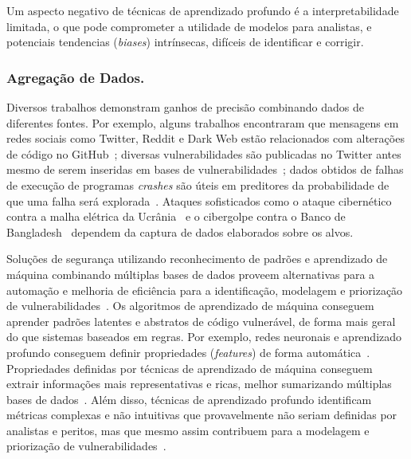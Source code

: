 Um aspecto negativo de técnicas de aprendizado profundo é a interpretabilidade limitada, o que pode comprometer a utilidade de modelos para analistas, e potenciais tendencias (\emph{biases}) intrínsecas, difíceis de identificar e corrigir.

\subsubsection{Agregação de Dados.}

Diversos trabalhos demonstram ganhos de precisão combinando dados de diferentes fontes. Por exemplo, alguns trabalhos encontraram que mensagens em redes sociais como Twitter, Reddit e Dark Web estão relacionados com alterações de código no GitHub~\cite{sameera19social}; diversas vulnerabilidades são publicadas no Twitter antes mesmo de serem inseridas em bases de vulnerabilidades~\cite{chen19vase,sabottke2015vulnerability}; dados obtidos de falhas de execução de programas \emph{crashes} são úteis em preditores da probabilidade de que uma falha será explorada~\cite{tripathi2017exniffer,yan17exploitmeter}. Ataques sofisticados como o ataque cibernético contra a malha elétrica da Ucrânia~\cite{defense16ukraine} e o cibergolpe contra o Banco de Bangladesh~\cite{hill18heist} dependem da captura de dados elaborados sobre os alvos.

Soluções de segurança utilizando reconhecimento de padrões e aprendizado de máquina combinando múltiplas bases de dados proveem alternativas para a automação e melhoria de eficiência para a identificação, modelagem e priorização de vulnerabilidades~\cite{coulter20cybersec, ghaffarian17vulnsurvey, liu18insider}. Os algoritmos de aprendizado de máquina conseguem aprender padrões latentes e abstratos de código vulnerável, de forma mais geral do que sistemas baseados em regras. Por exemplo, redes neuronais e aprendizado profundo conseguem definir propriedades (\emph{features}) de forma automática~\cite{wang16features}. Propriedades definidas por técnicas de aprendizado de máquina conseguem extrair informações mais representativas e ricas, melhor sumarizando múltiplas bases de dados~\cite{lin21multidomain}. Além disso, técnicas de aprendizado profundo identificam métricas complexas e não intuitivas que provavelmente não seriam definidas por analistas e peritos, mas que mesmo assim contribuem para a modelagem e priorização de vulnerabilidades~\cite{lecun15deeplearn, lin18vuln}.

